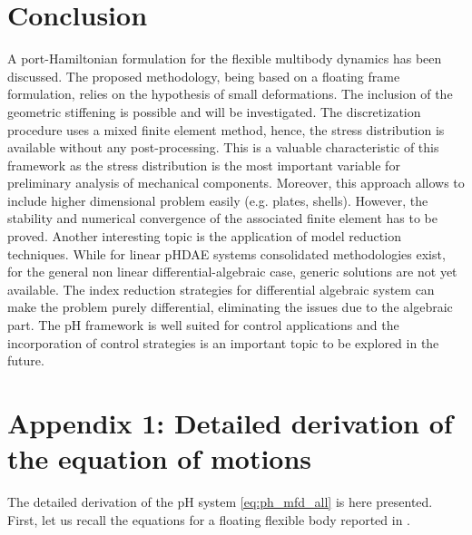 \documentclass{svjour3}                     %
\begin{document}
\section{Conclusion}
A port-Hamiltonian formulation for the flexible multibody dynamics has been discussed. The proposed methodology, being based on a floating frame formulation, relies on the hypothesis of small deformations. The inclusion of the geometric stiffening is possible and will be investigated. The discretization procedure uses a mixed finite element method, hence, the stress distribution is available without any post-processing. This is a valuable characteristic of this framework as the stress distribution is the most important variable for preliminary analysis of mechanical components. Moreover, this approach allows to include higher dimensional problem easily (e.g. plates, shells). However, the stability and numerical convergence of the associated finite element has to be proved. Another interesting topic is the application of model reduction techniques. While for linear pHDAE systems consolidated methodologies exist, for the general non linear differential-algebraic case, generic solutions are not yet available. The index reduction strategies for differential algebraic system can make the problem purely differential, eliminating the issues due to the algebraic part.  The pH framework is well suited for control applications and the incorporation of control strategies is an important topic to be explored in the future.



\section*{Appendix 1: Detailed derivation of the equation of motions}

The detailed derivation of the pH system \eqref{eq:ph_mfd_all} is here presented. First, let us recall the equations for a floating flexible body reported in \cite{MB_Daepde,simeon2013computational}.
\end{document}
